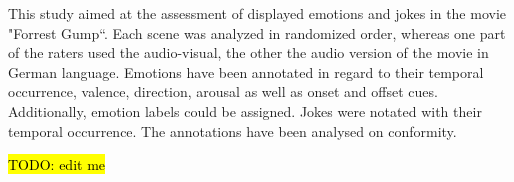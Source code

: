 This study aimed at the assessment of displayed emotions and jokes in the movie
"Forrest Gump“. Each scene was analyzed in randomized order, whereas one part
of the raters used the audio-visual, the other the audio version of the movie
in German language. Emotions have been annotated in regard to their temporal
occurrence, valence, direction, arousal as well as onset and offset cues.
Additionally, emotion labels could be assigned. Jokes were notated with their
temporal occurrence. The annotations have been analysed on conformity.

\hl{TODO: edit me}
